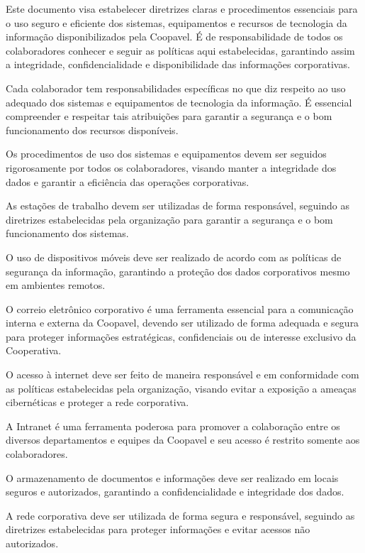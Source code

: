 \documentclass[a4paper,10pt,portuges]{sphinxmanual}
\begin{document}
\sphinxAtStartPar
Este documento visa estabelecer diretrizes claras e procedimentos essenciais para o uso
seguro e eficiente dos sistemas, equipamentos e recursos de tecnologia da informação
disponibilizados pela Coopavel. É de responsabilidade de todos os colaboradores
conhecer e seguir as políticas aqui estabelecidas, garantindo assim a integridade,
confidencialidade e disponibilidade das informações corporativas.

\sphinxAtStartPar
Cada colaborador tem responsabilidades específicas no que diz respeito ao uso adequado
dos sistemas e equipamentos de tecnologia da informação. É essencial compreender e
respeitar tais atribuições para garantir a segurança e o bom funcionamento dos recursos
disponíveis.

\sphinxAtStartPar
Os procedimentos de uso dos sistemas e equipamentos devem ser seguidos rigorosamente
por todos os colaboradores, visando manter a integridade dos dados e garantir a eficiência
das operações corporativas.

\sphinxAtStartPar
As estações de trabalho devem ser utilizadas de forma responsável, seguindo as diretrizes
estabelecidas pela organização para garantir a segurança e o bom funcionamento dos
sistemas.

\sphinxAtStartPar
O uso de dispositivos móveis deve ser realizado de acordo com as políticas de segurança
da informação, garantindo a proteção dos dados corporativos mesmo em ambientes
remotos.

\sphinxAtStartPar
O correio eletrônico corporativo é uma ferramenta essencial para a comunicação interna
e externa da Coopavel, devendo ser utilizado de forma adequada e segura para proteger
informações estratégicas, confidenciais ou de interesse exclusivo da Cooperativa.

\sphinxAtStartPar
O acesso à internet deve ser feito de maneira responsável e em conformidade com as
políticas estabelecidas pela organização, visando evitar a exposição a ameaças
cibernéticas e proteger a rede corporativa.

\sphinxAtStartPar
A Intranet é uma ferramenta poderosa para promover a colaboração entre os diversos
departamentos e equipes da Coopavel e seu acesso é restrito somente aos colaboradores.

\sphinxAtStartPar
O armazenamento de documentos e informações deve ser realizado em locais seguros e
autorizados, garantindo a confidencialidade e integridade dos dados.

\sphinxAtStartPar
A rede corporativa deve ser utilizada de forma segura e responsável, seguindo as
diretrizes estabelecidas para proteger informações e evitar acessos não autorizados.
\end{document}
